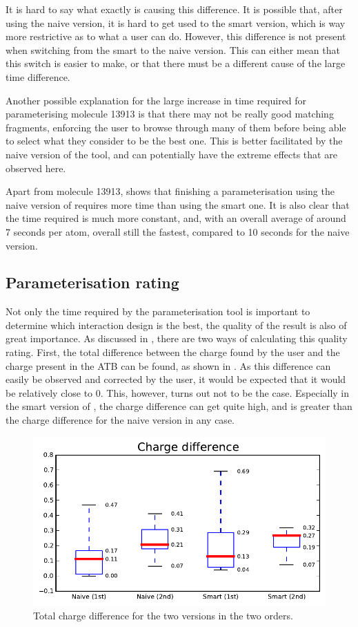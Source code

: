 It is hard to say what exactly is causing this difference. It is possible that, after using the naive version, it is hard to get used to the smart version, which is way more restrictive as to what a user can do. However, this difference is not present when switching from the smart to the naive version. This can either mean that this switch is easier to make, or that there must be a different cause of the large time difference.

Another possible explanation for the large increase in time required for parameterising molecule 13913 is that there may not be really good matching fragments, enforcing the user to browse through many of them before being able to select what they consider to be the best one. This is better facilitated by the naive version of the tool, and can potentially have the extreme effects that are observed here.

Apart from molecule 13913,  shows that finishing a parameterisation using the naive version of \oframp{} requires more time than using the smart one. It is also clear that the time required is much more constant, and, with an overall average of around 7 seconds per atom, overall still the fastest, compared to 10 seconds for the naive version.


\subsection{Parameterisation rating}
Not only the time required by the parameterisation tool is important to determine which interaction design is the best, the quality of the result is also of great importance. As discussed in , there are two ways of calculating this quality rating. First, the total difference between the charge found by the user and the charge present in the ATB can be found, as shown in . As this difference can easily be observed and corrected by the user, it would be expected that it would be relatively close to 0. This, however, turns out not to be the case. Especially in the smart version of \oframp, the charge difference can get quite high, and is greater than the charge difference for the naive version in any case.

\begin{figure}[h!]
\center
\includegraphics[width=.6\textwidth]{img/graphs/1a_00.pdf}
\caption{Total charge difference for the two versions in the two orders.}
\end{figure}

